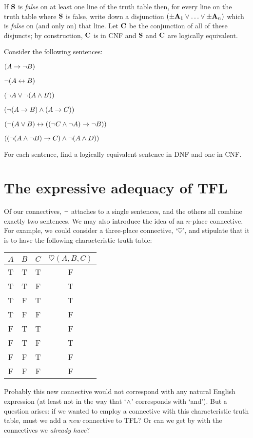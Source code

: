 	If $\mathbf{S}$ is \emph{false} on at least one line of the truth table then, for every line on the truth table where $\mathbf{S}$ is false, write down a disjunction $(\pm\mathbf{A}_1 \vee \ldots \vee \pm\mathbf{A}_n)$ which is \emph{false} on (and only on) that line. Let $\mathbf{C}$ be the conjunction of all of these disjuncts; by construction, $\mathbf{C}$ is in CNF and $\mathbf{S}$ and $\mathbf{C}$ are logically equivalent.

\practiceproblems
\problempart
\label{pr.DNF}
Consider the following sentences:
	\begin{earg}
		\item $(A \rightarrow \neg B)$
		\item $\neg (A \leftrightarrow B)$
		\item $(\neg A \vee \neg (A \wedge B))$
		\item $(\neg (A \rightarrow B ) \wedge (A \rightarrow C))$
		\item $(\neg (A \vee B) \leftrightarrow ((\neg C \wedge \neg A) \rightarrow \neg B))$
		\item $((\neg (A \wedge \neg B) \rightarrow C) \wedge \neg (A \wedge D))$
	\end{earg}
        For each sentence, find a logically equivalent sentence in DNF and one in CNF.
        
\section{The expressive adequacy of TFL}

Of our connectives, $\neg$ attaches to a single sentences, and the others all combine exactly two sentences. We may also introduce the idea of an $n$-place connective. For example, we could consider a three-place connective, `$\heartsuit$', and stipulate that it is to have the following characteristic truth table:
\begin{center}
\begin{tabular}{c c c | c}
$A$ & $B$ & $C$ & $\heartsuit(A,B,C)$\\
\hline
 T & T & T & F \\
 T & T & F & T \\
 T & F & T & T \\
 T & F & F & F \\
 F & T & T & F \\
 F & T & F & T \\
 F & F & T & F \\
 F & F & F & F
\end{tabular}
\end{center}
Probably this new connective would not correspond with any natural English expression (at least not in the way that `$\wedge$' corresponds with `and'). But a question arises: if we wanted to employ a connective with this characteristic truth table, must we add a \emph{new} connective to TFL? Or can we get by with the connectives we \emph{already have}?

